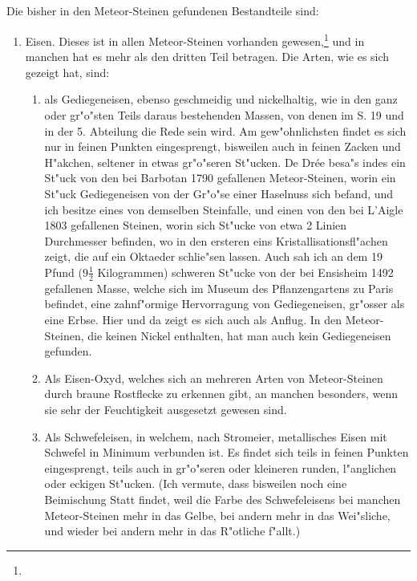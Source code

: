 \documentclass[a4paper, 11pt, oneside, polutonikogreek, german]{article}
\begin{document}
\subsection{}
\paragraph{}
Die bisher in den Meteor-Steinen gefundenen Bestandteile sind:
\begin{enumerate}
   \item Eisen. Dieses ist in allen Meteor-Steinen vorhanden gewesen,\footnote{} und in manchen hat es mehr als den dritten Teil betragen. Die Arten, wie es sich gezeigt hat, sind:
   \begin{enumerate}
     \item als Gediegeneisen, ebenso geschmeidig und nickelhaltig, wie in den ganz oder gr"o"sten Teils daraus bestehenden Massen, von denen im S. 19 und in der 5. Abteilung die Rede sein wird. Am gew"ohnlichsten findet es sich nur in feinen Punkten eingesprengt, bisweilen auch in feinen Zacken und H"akchen, seltener in etwas gr"o"seren St"ucken. De Drée besa"s indes ein St"uck von den bei Barbotan 1790 gefallenen Meteor-Steinen, worin ein St"uck Gediegeneisen von der Gr"o"se einer Haselnuss sich befand, und ich besitze eines von demselben Steinfalle, und einen von den bei L'Aigle 1803 gefallenen Steinen, worin sich St"ucke von etwa 2 Linien Durchmesser befinden, wo in den ersteren eins Kristallisationsfl"achen zeigt, die auf ein Oktaeder schlie"sen lassen. Auch sah ich an dem 19 Pfund ($\mathfrak{9\frac{1}{2}}$ Kilogrammen) schweren St"ucke von der bei Ensisheim 1492 gefallenen Masse, welche sich im Museum des Pflanzengartens zu Paris befindet, eine zahnf"ormige Hervorragung von Gediegeneisen, gr"osser als eine Erbse. Hier und da zeigt es sich auch als Anflug. In den Meteor-Steinen, die keinen Nickel enthalten, hat man auch kein Gediegeneisen gefunden.
     \item Als Eisen-Oxyd, welches sich an mehreren Arten von Meteor-Steinen durch braune Rostflecke zu erkennen gibt, an manchen besonders, wenn sie sehr der Feuchtigkeit ausgesetzt gewesen sind.
     \item Als Schwefeleisen, in welchem, nach Stromeier, metallisches Eisen mit Schwefel in Minimum verbunden ist. Es findet sich teils in feinen Punkten eingesprengt, teils auch in gr"o"seren oder kleineren runden, l"anglichen oder eckigen St"ucken. (Ich vermute, dass bisweilen noch eine Beimischung Statt findet, weil die Farbe des Schwefeleisens bei manchen Meteor-Steinen mehr in das Gelbe, bei andern mehr in das Wei"sliche, und wieder bei andern mehr in das R"otliche f"allt.)

\end{enumerate}
\end{enumerate}
\end{document}
